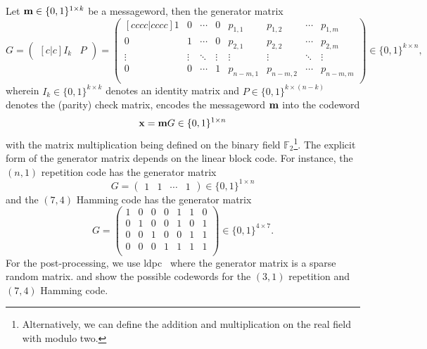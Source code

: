 Let $\vb{m}\in\{0,1\}^{1\times k}$ be a messageword, then the generator matrix
\begin{equation}
	G
	=
	\begin{pmatrix}[c|c]
		I_k & P
	\end{pmatrix}
	=
	\begin{pmatrix}[cccc|cccc]
		1 & 0 & \cdots & 0 & p_{1,1} & p_{1,2} & \cdots & p_{1,m} \\
		0 & 1 & \cdots & 0 & p_{2,1} & p_{2,2} & \cdots & p_{2,m}\\
		\vdots & \vdots  & \ddots & \vdots & \vdots & \vdots & \ddots & \vdots \\
		0 & 0 & \cdots & 1 & p_{n-m,1} & p_{n-m,2} & \cdots & p_{n-m,m} \\
	\end{pmatrix}
	\in\{0,1\}^{k\times n}
	,
\end{equation}
wherein $I_k\in\{0,1\}^{k\times k}$ denotes an identity matrix and $P\in\{0,1\}^{k\times(n-k)}$ denotes the (parity) check matrix,
encodes the messageword $\vb{m}$ into the codeword
\begin{equation}
	\vb{x}
	=
	\vb{m}G
	\in\{0,1\}^{1\times n}
\end{equation}
with the matrix multiplication being defined on the binary field $\mathbb{F}_2$\footnote{Alternatively, we can define the addition and multiplication on the real field with modulo two.}.
The explicit form of the generator matrix depends on the linear block code.
For instance, the $(n,1)$ repetition code has the generator matrix
\begin{equation}
	G
	=
	\begin{pmatrix}
		1 & 1 & \cdots & 1
	\end{pmatrix}
	\in\{0,1\}^{1\times n}
\end{equation}
and the $(7,4)$ Hamming code has the generator matrix
\begin{equation}
	G
	=
	\begin{pmatrix}
		1 & 0 & 0 & 0 & 1 & 1 & 0 \\
		0 & 1 & 0 & 0 & 1 & 0 & 1 \\
		0 & 0 & 1 & 0 & 0 & 1 & 1 \\
		0 & 0 & 0 & 1 & 1 & 1 & 1 \\
	\end{pmatrix}
	\in\{0,1\}^{4\times 7}
	.
\end{equation}
For the post-processing, we use \gls{ldpc}~\cite{Gallager1962} where the generator matrix is a sparse random matrix.
 and  show the possible codewords for the $(3,1)$ repetition and $(7,4)$ Hamming code.
